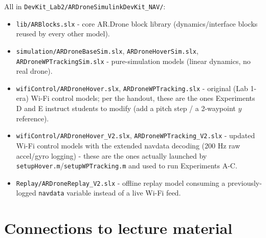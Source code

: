 \documentclass[11pt]{article}
\begin{document}
All in \texttt{DevKit\_\allowbreak{}Lab2/\allowbreak{}ARDroneSimulinkDevKit\_\allowbreak{}NAV/}:
\begin{itemize}
\item \texttt{lib/ARBlocks.slx} - core AR.Drone block library (dynamics/interface blocks reused by every other model).
\item \texttt{simulation/\allowbreak{}ARDroneBaseSim.slx}, \texttt{ARDroneHoverSim.slx}, \texttt{ARDroneWPTrackingSim.slx} - pure-simulation models (linear dynamics, no real drone).
\item \texttt{wifiControl/\allowbreak{}ARDroneHover.slx}, \texttt{ARDroneWPTracking.slx} - original (Lab 1-era) Wi-Fi control models; per the handout, these are the ones Experiments D and E instruct students to modify (add a pitch step / a 2-waypoint $y$ reference).
\item \texttt{wifiControl/\allowbreak{}ARDroneHover\_\allowbreak{}V2.slx}, \texttt{ARDroneWPTracking\_\allowbreak{}V2.slx} - updated Wi-Fi control models with the extended navdata decoding (200 Hz raw accel/gyro logging) - these are the ones actually launched by \texttt{setupHover.m}/\texttt{setupWPTracking.m} and used to run Experiments A-C.
\item \texttt{Replay/\allowbreak{}ARDroneReplay\_\allowbreak{}V2.slx} - offline replay model consuming a previously-logged \texttt{navdata} variable instead of a live Wi-Fi feed.
\end{itemize}

\section{Connections to lecture material}
\end{document}
